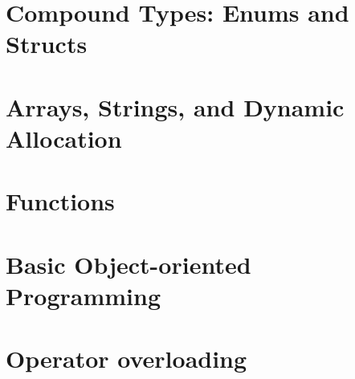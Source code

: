 \documentclass[UTF8]{ctexart}
\begin{document}
\newpage

\section{Compound Types: Enums and Structs}












\newpage

\section{Arrays, Strings, and Dynamic Allocation}















\newpage

\section{Functions}

\newpage

\section{Basic Object-oriented Programming}

\newpage

\section{Operator overloading}
\end{document}
